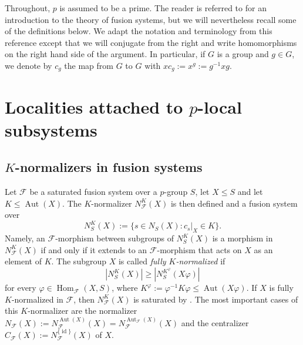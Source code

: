 \documentclass[reqno,11pt]{amsart}
\numberwithin{equation}{section}
\theoremstyle{definition}
\newcommand{\F}{\mathcal{F}}
\newcommand{\Hom}{\operatorname{Hom}}
\newcommand{\Aut}{\operatorname{Aut}}
\newcommand{\id}{\operatorname{id}}
\renewcommand{\phi}{\varphi}
\begin{document}
\smallskip

Throughout, $p$ is assumed to be a prime. The reader is referred to \cite[Sections~I.1-I.7]{Aschbacher/Kessar/Oliver:2011} for an introduction to the theory of fusion systems, but we will nevertheless recall some of the definitions below. We adapt the notation and terminology from this reference except that we will conjugate from the right and write homomorphisms on the right hand side of the argument. In particular, if $G$ is a group and $g\in G$, we denote by $c_g$ the map from $G$ to $G$ with $xc_g:=x^g:=g^{-1}xg$. 


\section{Localities attached to $p$-local subsystems}



\subsection{$K$-normalizers in fusion systems}

Let $\F$ be a saturated fusion system over a $p$-group $S$, let $X\leq S$ and let $K\leq \Aut(X)$. The $K$-normalizer $N_\F^K(X)$ is then defined and a fusion system over 
\[N_S^K(X):=\{s\in N_S(X)\colon c_s|_X\in K\}.\]
Namely, an $\F$-morphism between subgroups of $N_S^K(X)$ is a morphism in $N_\F^K(X)$ if and only if it extends to an $\F$-morphism that acts on $X$ as an element of $K$. The subgroup $X$ is called \emph{fully $K$-normalized} if 
\[|N_S^K(X)|\geq |N_S^{K^\phi}(X\phi)|\]
for every $\phi\in\Hom_\F(X,S)$, where $K^\phi:=\phi^{-1}K\phi\leq \Aut(X\phi)$. If $X$ is fully $K$-normalized in $\F$, then $N_\F^K(X)$ is saturated by \cite[Theorem~I.5.5]{Aschbacher/Kessar/Oliver:2011}. The most important cases of this $K$-normalizer are the normalizer $N_\F(X):=N_\F^{\Aut(X)}(X)=N_\F^{\Aut_\F(X)}(X)$ and the centralizer $C_\F(X):=N_\F^{\{\id\}}(X)$ of $X$. 
\end{document}
